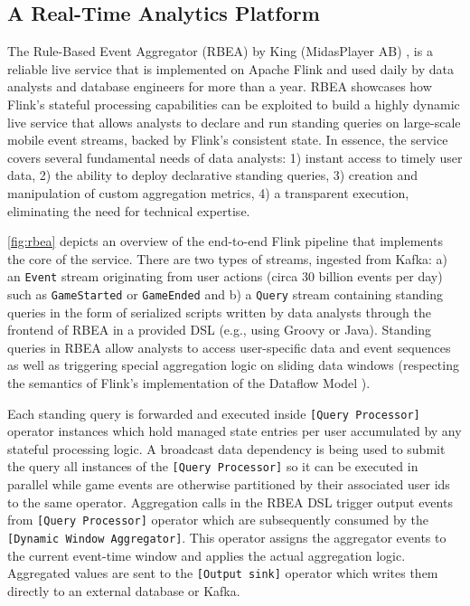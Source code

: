 



\subsection{A Real-Time Analytics Platform}

The Rule-Based Event Aggregator (RBEA) by King (MidasPlayer AB) \cite{CUSTOM:web/kingrbea}, is a reliable live service that is implemented on Apache Flink and used daily by data analysts and database engineers for more than a year. RBEA showcases how Flink's stateful processing capabilities can be exploited to build a highly dynamic live service that allows analysts to declare and run standing queries on large-scale mobile event streams, backed by Flink's consistent state. In essence, the service covers several fundamental needs of data analysts: 1) instant access to timely user data, 2) the ability to deploy declarative standing queries, 3) creation and manipulation of custom aggregation metrics, 4) a transparent execution, eliminating the need for technical expertise.

\autoref{fig:rbea} depicts an overview of the end-to-end Flink pipeline that implements the core of the service. There are two types of streams, ingested from Kafka: a) an \texttt{Event} stream originating from  user actions (circa 30 billion events per day) such as \texttt{GameStarted} or \texttt{GameEnded} and b) a \texttt{Query} stream containing standing queries in the form of serialized scripts written by data analysts through the frontend of RBEA in a provided DSL (e.g., using Groovy or Java). Standing queries in RBEA allow analysts to access user-specific data and event sequences as well as triggering special aggregation logic on sliding data windows (respecting the semantics of Flink's implementation of the Dataflow Model \cite{akidau2015dataflow}). 

Each standing query is forwarded and executed inside \texttt{[Query Processor]} operator instances which hold managed state entries per user accumulated by any stateful processing logic. A broadcast data dependency is being used to submit the query all instances of the \texttt{[Query Processor]} so it can be executed in parallel while game events are otherwise partitioned by their associated user ids to the same operator. Aggregation calls in the RBEA DSL trigger output events from \texttt{[Query Processor]} operator which are subsequently consumed by the \texttt{[Dynamic Window Aggregator]}. This operator assigns the aggregator events to the current event-time window and applies the actual aggregation logic. Aggregated values are sent to the \texttt{[Output sink]} operator which writes them directly to an external database or Kafka.


